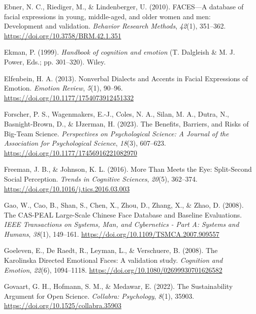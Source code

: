 \documentclass[
  letterpaper,
  DIV=11,
  numbers=noendperiod]{scrartcl}
\newlength{\cslhangindent}
\newenvironment{CSLReferences}[2] %
 {\begin{list}{}{%
  \setlength{\itemindent}{0pt}
  \setlength{\leftmargin}{0pt}
  \setlength{\parsep}{0pt}
  \ifodd #1
   \setlength{\leftmargin}{\cslhangindent}
   \setlength{\itemindent}{-1\cslhangindent}
  \fi
  \setlength{\itemsep}{#2\baselineskip}}}
 {\end{list}}
\begin{document}
\begin{CSLReferences}{1}{0}
Ebner, N. C., Riediger, M., \& Lindenberger, U. (2010). {FACES}---{A}
database of facial expressions in young, middle-aged, and older women
and men: {Development} and validation. \emph{Behavior Research Methods},
\emph{42}(1), 351--362. \url{https://doi.org/10.3758/BRM.42.1.351}

Ekman, P. (1999). \emph{Handbook of cognition and emotion} (T. Dalgleish
\& M. J. Power, Eds.; pp. 301--320). Wiley.

Elfenbein, H. A. (2013). Nonverbal {Dialects} and {Accents} in {Facial}
{Expressions} of {Emotion}. \emph{Emotion Review}, \emph{5}(1), 90--96.
\url{https://doi.org/10.1177/1754073912451332}

Forscher, P. S., Wagenmakers, E.-J., Coles, N. A., Silan, M. A., Dutra,
N., Basnight-Brown, D., \& IJzerman, H. (2023). The {Benefits},
{Barriers}, and {Risks} of {Big}-{Team} {Science}. \emph{Perspectives on
Psychological Science: A Journal of the Association for Psychological
Science}, \emph{18}(3), 607--623.
\url{https://doi.org/10.1177/17456916221082970}

Freeman, J. B., \& Johnson, K. L. (2016). More {Than} {Meets} the {Eye}:
{Split}-{Second} {Social} {Perception}. \emph{Trends in Cognitive
Sciences}, \emph{20}(5), 362--374.
\url{https://doi.org/10.1016/j.tics.2016.03.003}

Gao, W., Cao, B., Shan, S., Chen, X., Zhou, D., Zhang, X., \& Zhao, D.
(2008). The {CAS}-{PEAL} {Large}-{Scale} {Chinese} {Face} {Database} and
{Baseline} {Evaluations}. \emph{IEEE Transactions on Systems, Man, and
Cybernetics - Part A: Systems and Humans}, \emph{38}(1), 149--161.
\url{https://doi.org/10.1109/TSMCA.2007.909557}

Goeleven, E., De Raedt, R., Leyman, L., \& Verschuere, B. (2008). The
{Karolinska} {Directed} {Emotional} {Faces}: {A} validation study.
\emph{Cognition and Emotion}, \emph{22}(6), 1094--1118.
\url{https://doi.org/10.1080/02699930701626582}

Govaart, G. H., Hofmann, S. M., \& Medawar, E. (2022). The
{Sustainability} {Argument} for {Open} {Science}. \emph{Collabra:
Psychology}, \emph{8}(1), 35903.
\url{https://doi.org/10.1525/collabra.35903}


\end{CSLReferences}
\end{document}
